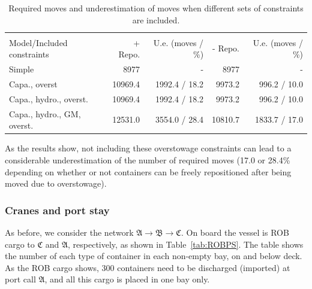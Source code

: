 \begin{table}[width=.9\linewidth,cols=5,pos=h]
\caption{Required moves and underestimation of moves when different sets of constraints are included.}\label{tab:resultsOverst}
\begin{tabular*}{\tblwidth}{@{} LRRRR@{}}
\toprule
& \\
Model/Included constraints	& + Repo. & U.e. (moves / \%) & - Repo. & U.e. (moves / \%)\\
\midrule
Simple 						& 8977    & - 			  & 8977 	&  - \\
Capa., overst				& 10969.4 & 1992.4 / 18.2 & 9973.2 	&  996.2 / 10.0\\
Capa., hydro., overst.		& 10969.4 & 1992.4 / 18.2 & 9973.2 	&  996.2 / 10.0\\
Capa., hydro., GM, overst. 	& 12531.0 & 3554.0 / 28.4 & 10810.7 & 1833.7 / 17.0\\
\bottomrule
\end{tabular*}
\end{table}

As the results show, not including these overstowage constraints can lead to a considerable underestimation of the number of required moves (17.0 or 28.4\% depending on whether or not containers can be freely repositioned after being moved due to overstowage).

\subsubsection{Cranes and port stay}
As before, we consider the network $\mathfrak{A} \rightarrow \mathfrak{B} \rightarrow \mathfrak{C}$. On board the vessel is ROB cargo to $\mathfrak{C}$ and $\mathfrak{A}$, respectively, as shown in Table~\ref{tab:ROBPS}. 
The table shows the number of each type of container in each non-empty bay, on and below deck. As the ROB cargo shows, 300 containers need to be discharged (imported) at port call $\mathfrak{A}$, and all this cargo is placed in one bay only.


